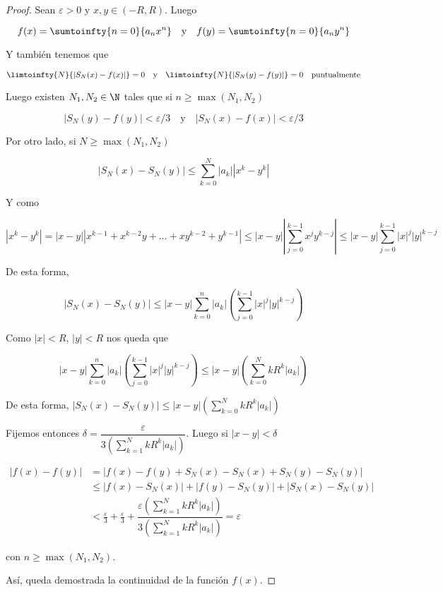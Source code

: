 \begin{proof}
    Sean $\varepsilon>0$ y $x,y \in (-R,R)$. Luego
    
    \[
    f(x) = \sumtoinfty{n=0}{a_nx^n} \quad \text{y} \quad f(y) = \sumtoinfty{n=0}{a_ny^n}
    \]
    
    Y también tenemos que
    
    \[
    \limtoinfty{N}{|S_N(x) - f(x)|} = 0 \quad \text{y} \quad \limtoinfty{N}{|S_N(y) - f(y)|} = 0 \quad \text{puntualmente}
    \]
    
    Luego existen $N_1, N_2 \in \N$ tales que si $n \geq \max(N_1, N_2)$
    
    \[
    |S_N(y) - f(y)| < \varepsilon/3 \quad \text{y} \quad |S_N(x) - f(x)| < \varepsilon/3
    \]
    
    Por otro lado, si $N \geq \max(N_1,N_2)$
    
    \[
    |S_N(x) - S_N(y)| \leq \sum_{k=0}^N |a_k||x^k-y^k|
    \]
    
    Y como
    
    \[
    |x^k-y^k| = |x-y||x^{k-1}+ x^{k-2}y + \dots + xy^{k-2} + y^{k-1}| \leq |x-y|\left|\sum_{j=0}^{k-1} x^j y^{k-j}\right| \leq |x-y|\sum_{j=0}^{k-1}|x|^j|y|^{k-j}
    \]
    
    De esta forma,
    
    \[
    |S_N(x) - S_N(y)| \leq |x-y| \sum_{k=0}^n |a_k| \left(\sum_{j=0}^{k-1}|x|^j|y|^{k-j}\right)
    \]
    
    Como $|x|<R$, $|y|<R$ nos queda que
    
    \[
    |x-y| \sum_{k=0}^n |a_k| \left(\sum_{j=0}^{k-1}|x|^j|y|^{k-j}\right) \leq |x-y|\left(\sum_{k=0}^N kR^k|a_k|\right)
    \]
    
    De esta forma, $\displaystyle |S_N(x) - S_N(y)| \leq |x-y|\left(\sum_{k=0}^N kR^k|a_k|\right)$
    
    Fijemos entonces $\displaystyle \delta = \dfrac{\varepsilon}{\displaystyle 3\left(\sum_{k=1}^N kR^k|a_k|\right)}$. Luego si $|x-y| < \delta$
    
    \begin{align*}
        |f(x) - f(y)| &= |f(x) - f(y) + S_N(x) - S_N(x) + S_N(y) - S_N(y)| \\
        &\leq |f(x) - S_N(x)| + |f(y) - S_N(y)| + |S_N(x) - S_N(y)| \\
        &< \frac{\varepsilon}{3} + \frac{\varepsilon}{3} + \dfrac{\displaystyle\varepsilon\left(\sum_{k=1}^N kR^k|a_k|\right)}{\displaystyle 3\left(\sum_{k=1}^N kR^k|a_k|\right)} = \varepsilon
    \end{align*}
    
    \noindent con $n \geq \max(N_1,N_2)$.
    
    Así, queda demostrada la continuidad de la función $f(x)$.
\end{proof}

